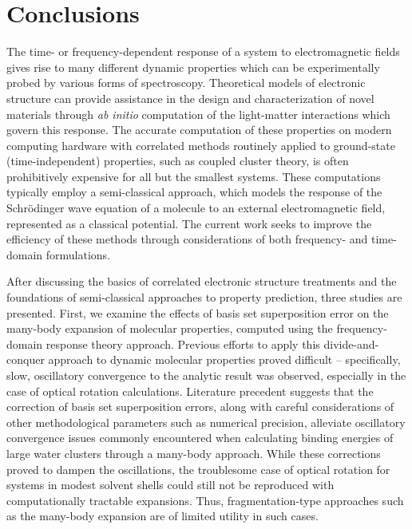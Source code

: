 \chapter{Conclusions} \label{ch:conc} The time- or frequency-dependent
response of a system to electromagnetic fields gives rise to many different
dynamic properties which can be experimentally probed by various forms
of spectroscopy. Theoretical models of electronic structure can provide
assistance in the design and characterization of novel materials through
\textit{ab initio} computation of the light-matter interactions which
govern this response. The accurate computation of these properties on
modern computing hardware with correlated methods routinely applied
to ground-state (time-independent) properties, such as coupled cluster
theory, is often prohibitively expensive for all but the smallest systems.
These computations typically employ a semi-classical approach, which
models the response of the Schr\"odinger wave equation of a molecule to
an external electromagnetic field, represented as a classical potential.
The current work seeks to improve the efficiency of these methods through
considerations of both frequency- and time-domain formulations.

After discussing the basics of correlated electronic structure treatments
and the foundations of semi-classical approaches to property prediction,
three studies are presented. First, we examine the effects of basis set
superposition error on the many-body expansion of molecular properties,
computed using the frequency-domain response theory approach. Previous
efforts to apply this divide-and-conquer approach to dynamic molecular
properties proved difficult -- specifically, slow, oscillatory convergence
to the analytic result was observed, especially in the case of optical
rotation calculations. Literature precedent suggests that the correction of
basis set superposition errors, along with careful considerations of other
methodological parameters such as numerical precision, alleviate oscillatory
convergence issues commonly encountered when calculating binding energies of
large water clusters through a many-body approach. While these corrections
proved to dampen the oscillations, the troublesome case of optical rotation
for systems in modest solvent shells could still not be reproduced with
computationally tractable expansions. Thus, fragmentation-type approaches
such as the many-body expansion are of limited utility in such cases.

